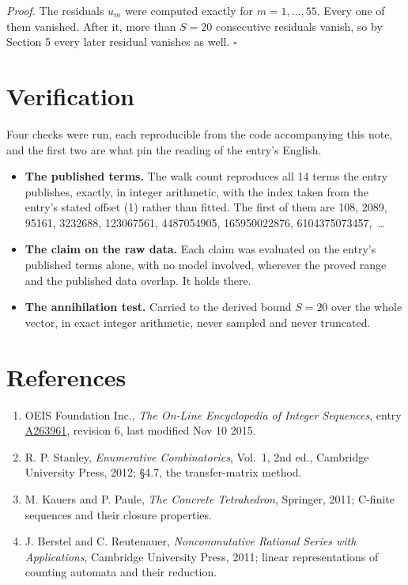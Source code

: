 \documentclass[11pt]{article}
\theoremstyle{definition}
\begin{document}
{\itshape Proof.} The residuals $u_m$ were computed exactly for $m = 1,\dots,55$. Every one of them vanished. After it, more than $S = 20$ consecutive residuals vanish, so by Section 5 every later residual vanishes as well. $\square$

\section{Verification}

Four checks were run, each reproducible from the code accompanying this note, and the first two are what pin the reading of the entry's English.

\begin{itemize}

\item {\bfseries The published terms.} The walk count reproduces all 14 terms the entry publishes, exactly, in integer arithmetic, with the index taken from the entry's stated offset (1) rather than fitted. The first of them are 108, 2089, 95161, 3232688, 123067561, 4487054905, 165950022876, 6104375073457,~\dots

\item {\bfseries The claim on the raw data.} Each claim was evaluated on the entry's published terms alone, with no model involved, wherever the proved range and the published data overlap. It holds there.

\item {\bfseries The annihilation test.} Carried to the derived bound $S = 20$ over the whole vector, in exact integer arithmetic, never sampled and never truncated.

\end{itemize}

\section{References}

\begin{enumerate}

\item OEIS Foundation Inc., \emph{The On-Line Encyclopedia of Integer Sequences}, entry \href{https://oeis.org/A263961}{A263961}, revision 6, last modified Nov 10 2015.

\item R. P. Stanley, \emph{Enumerative Combinatorics}, Vol.~1, 2nd ed., Cambridge University Press, 2012; \S4.7, the transfer-matrix method.

\item M. Kauers and P. Paule, \emph{The Concrete Tetrahedron}, Springer, 2011; C-finite sequences and their closure properties.

\item J. Berstel and C. Reutenauer, \emph{Noncommutative Rational Series with Applications}, Cambridge University Press, 2011; linear representations of counting automata and their reduction.

\end{enumerate}
\end{document}
